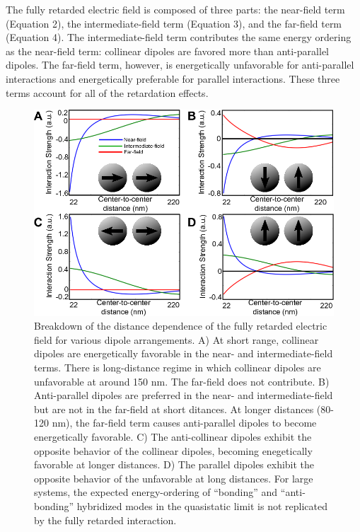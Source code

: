 \documentclass[journal=jpccck,manuscript=article]{achemso}
\begin{document}
The fully retarded electric field is composed of three parts: the near-field term (Equation 2), the intermediate-field term (Equation 3), and the far-field term (Equation 4). The intermediate-field term contributes the same energy ordering as the near-field term: collinear dipoles are favored more than anti-parallel dipoles. The far-field term, however, is energetically unfavorable for anti-parallel interactions and energetically preferable for parallel interactions. These three terms account for all of the retardation effects\cite{Purcell1973}.

\begin{figure}
  \includegraphics[scale=0.5]{dimer_interaction_3.png}
  \caption{Breakdown of the distance dependence of the fully retarded electric field for various dipole arrangements. A) At short range, collinear dipoles are energetically favorable in the near- and intermediate-field terms. There is long-distance regime in which collinear dipoles are unfavorable at around 150 nm. The far-field does not contribute. B) Anti-parallel dipoles are preferred in the near- and intermediate-field but are not in the far-field at short ditances. At longer distances (80-120 nm), the far-field term causes anti-parallel dipoles to become energetically favorable. C) The anti-collinear dipoles exhibit the opposite behavior of the collinear dipoles, becoming enegetically favorable at longer distances. D) The parallel dipoles exhibit the opposite behavior of the unfavorable at long distances. For large systems, the expected energy-ordering of ``bonding'' and ``anti-bonding'' hybridized modes in the quasistatic limit is not replicated by the fully retarded interaction. }
  \label{fig4}
\end{figure}
\end{document}
